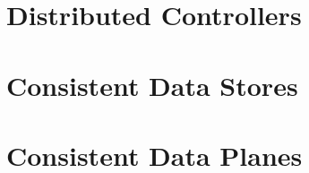 


\section{Distributed Controllers}
\glsresetall
\label{sec:relatedWork:distributed}

\section{Consistent Data Stores}
\glsresetall
\label{sec:relatedWork:consistentDataStore}

\section{Consistent Data Planes}
\glsresetall
\label{sec:relatedWork:consistentPlane}


